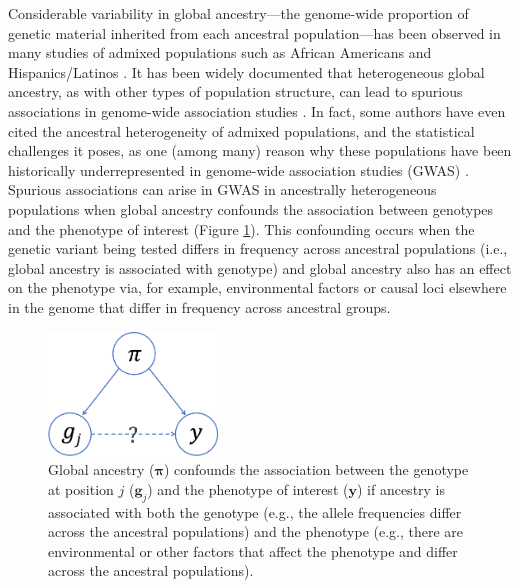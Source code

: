 \documentclass[12pt]{article}
\begin{document}
Considerable variability in global ancestry---the genome-wide proportion of genetic material inherited from each ancestral population---has been observed in many studies of admixed populations such as African Americans and Hispanics/Latinos \citep{parra1998, tishkoff2009, bryc2010aa, bryc2010hl, conomos2016}.
It has been widely documented that heterogeneous global ancestry, as with other types of population structure, can lead to spurious associations in genome-wide association studies \citep{GenomicControl, eigenstrat, marchini2004, price2010}. 
In fact, some authors have even cited the ancestral heterogeneity of admixed populations, and the statistical challenges it poses, as one (among many) reason why these populations have been historically underrepresented in genome-wide association studies (GWAS) \citep{need2009, bustamante2011, popejoy2016, hindorff2018, manolio2019}.
Spurious associations can arise in GWAS in ancestrally heterogeneous populations when global ancestry confounds the association between genotypes and the phenotype of interest (Figure \ref{fig:confounding}). 
This confounding occurs when the genetic variant being tested differs in frequency across ancestral populations (i.e., global ancestry is associated with genotype) and global ancestry also has an effect on the phenotype via, for example, environmental factors or causal loci elsewhere in the genome that differ in frequency across ancestral groups.

\begin{figure}[h]
\center
\includegraphics[width=0.4\textwidth]{figs/confounding}
\caption{Global ancestry ($\boldsymbol\pi$) confounds the association between the genotype at position $j$ ($\mathbf{g}_j$) and the phenotype of interest ($\mathbf{y}$) if ancestry is associated with both the genotype (e.g., the allele frequencies differ across the ancestral populations) and the phenotype (e.g., there are environmental or other factors that affect the phenotype and differ across the ancestral populations).}
\label{fig:confounding}
\end{figure}
\end{document}
